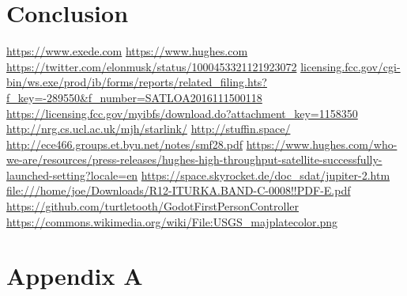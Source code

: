 \documentclass[12pt]{article}
\begin{document}
\section{Conclusion}


\begin{thebibliography}{99}
	 \url{https://www.exede.com}
	 \url{https://www.hughes.com}
	 \url{https://twitter.com/elonmusk/status/1000453321121923072}
	 \url{licensing.fcc.gov/cgi-bin/ws.exe/prod/ib/forms/reports/related_filing.hts?f_key=-289550&f_number=SATLOA2016111500118}
	 \url{https://licensing.fcc.gov/myibfs/download.do?attachment_key=1158350}
	 \url{http://nrg.cs.ucl.ac.uk/mjh/starlink/}
	 \url{http://stuffin.space/}
	 \url{http://ece466.groups.et.byu.net/notes/smf28.pdf}
	 \url{https://www.hughes.com/who-we-are/resources/press-releases/hughes-high-throughput-satellite-successfully-launched-setting?locale=en}
	 \url{https://space.skyrocket.de/doc_sdat/jupiter-2.htm}
	 \url{file:///home/joe/Downloads/R12-ITURKA.BAND-C-0008!!PDF-E.pdf}
	 \url{https://github.com/turtletooth/GodotFirstPersonController}
	 \url{https://commons.wikimedia.org/wiki/File:USGS_majplatecolor.png}
\end{thebibliography}
\appendix

\section{Appendix A}

\printindex

\end{document}

